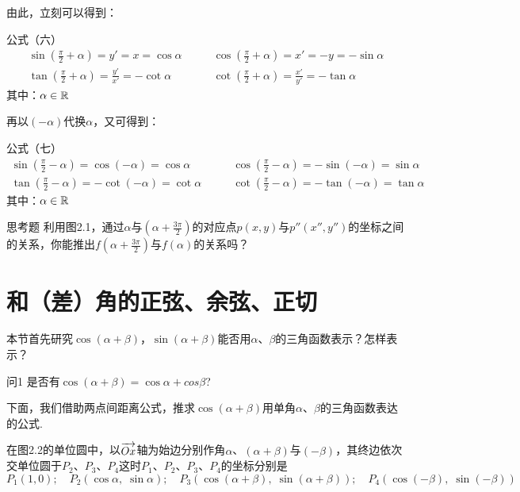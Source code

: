 由此，立刻可以得到：
\begin{thm}{公式（六）}
\[\begin{split}
\sin\left(\frac{\pi}{2}+\alpha\right)=y'=x=\cos\alpha&\qquad \cos\left(\frac{\pi}{2}+\alpha\right)=x'=-y=-\sin\alpha\\
\tan\left(\frac{\pi}{2}+\alpha\right)=\frac{y'}{x'}=-\cot\alpha &\qquad \cot\left(\frac{\pi}{2}+\alpha\right)=\frac{x'}{y'}=-\tan\alpha
\end{split}\]
其中：$\alpha\in \mathbb{R}$
\end{thm}

再以$(-\alpha)$代换$\alpha$，又可得到：
\begin{thm}{公式（七）}
\[\begin{split}
\sin\left(\frac{\pi}{2}-\alpha\right)=\cos(-\alpha)=\cos\alpha&\qquad \cos\left(\frac{\pi}{2}-\alpha\right)=-\sin(-\alpha)=\sin\alpha\\
\tan\left(\frac{\pi}{2}-\alpha\right)=-\cot(-\alpha)=\cot\alpha &\qquad \cot\left(\frac{\pi}{2}-\alpha\right)=-\tan(-\alpha)=\tan\alpha
\end{split}\]
其中：$\alpha\in \mathbb{R}$
\end{thm}

\begin{thm}{思考题}
利用图2.1，通过$\alpha$与$\left(\alpha+\frac{3\pi}{2}\right)$的对应点$p(x,y)$与$p''(x'',y'')$的坐标之间的关系，你能推出$f\left(\alpha+\frac{3\pi}{2}\right)$与$f(\alpha)$的关系吗？
\end{thm}

\section{和（差）角的正弦、余弦、正切}
本节首先研究$\cos(\alpha+\beta )$，$\sin(\alpha+\beta )$能否用$\alpha$、$\beta$的三角函数表示？怎样表示？

\begin{thm}
    {问1} 是否有$\cos(\alpha+\beta)=\cos\alpha+cos\beta$?
\end{thm}

下面，我们借助两点间距离公式，推求$\cos(\alpha+\beta )$用单角$\alpha$、$\beta$的三角函数表达的公式.

在图2.2的单位圆中，以$\overrightarrow{Ox}$轴为始边分别作角$\alpha$、$(\alpha+\beta )$与$(-\beta)$，其终边依次交单位圆于$P_2$、$P_3$、$P_4$这时$P_1$、$P_2$、$P_3$、$P_4$的坐标分别是
\[P_1(1,0);\quad
P_2(\cos\alpha,\; \sin\alpha);\quad
P_3(\cos(\alpha+\beta ),\; \sin(\alpha+\beta ));\quad
P_4(\cos(-\beta ),\; \sin(-\beta))\]    


